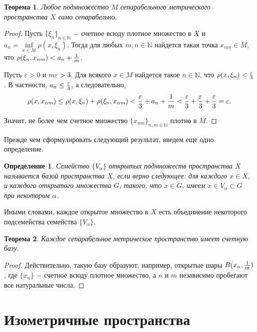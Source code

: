 \documentclass{article}
\newtheorem{theorem}{Теорема}[section]
\newtheorem{definition}{Определение}[section]
\begin{document}
\begin{theorem}
Любое подмножество \(M\) сепарабельного метрического пространства \(X\) само сепарабельно.
\end{theorem}

\begin{proof}
Пусть \(\{\xi_n\}_{n \in \mathbb{N}}\) \(-\) счетное всюду плотное множество в \(X\) и \(a_n = \inf\limits_{x \in M} {\rho(x, \xi_n)}\). Тогда для любых \(m, n \in \mathbb{N}\) найдется такая точка \(x_{nm} \in M\), что \(\rho(\xi_n, x_{nm}) < a_n + {1 \over m}\).

Пусть \(\varepsilon > 0\) и \(m\varepsilon > 3\). Для всякого \(x \in M\) найдется такое \(n \in \mathbb{N}\), что \(\rho(x, \xi_n) < {\varepsilon \over 3}\). В частности, \(a_n \leq {\varepsilon \over 3}\), а следовательно,
\[
\rho(x, x_{nm}) \leq \rho(x, \xi_n) + \rho(\xi_n, x_{nm}) < {\varepsilon \over 3} + a_n + {1 \over m} < {\varepsilon \over 3} + {\varepsilon \over 3} + {\varepsilon \over 3} = \varepsilon.
\]

Значит, не более чем счетное множество \(\{x_{nm}\}_{n, m \in \mathbb{N}}\) плотно в \(M\).
\end{proof}

Прежде чем сформулировать следующий результат, введем еще одно определение.

\begin{definition}
Семейство \(\{V_\alpha\}\) открытых подмножеств пространства \(X\) называется базой пространства \(X\), если верно следующее: для каждого \(x \in X\), и каждого открытого множества \(G\), такого, что \(x \in G\), имеем \(x \in V_\alpha \subset G\) при некотором \(\alpha\).
\end{definition}

Иными словами, каждое открытое множество в \(X\) есть объединение некоторого подсемейства семейства \(\{V_\alpha\}\).

\begin{theorem}
Каждое сепарабельное метрическое пространство имеет счетную базу.
\end{theorem}

\begin{proof}
Действительно, такую базу образуют, например, открытые шары \(B(x_n, {1 \over m})\), где \(\{x_{n}\}\) \(-\) счетное всюду плотное множество, а \(n\) и \(m\) независимо пробегают все натуральные числа.
\end{proof}

\section{Изометричные пространства}
\end{document}
